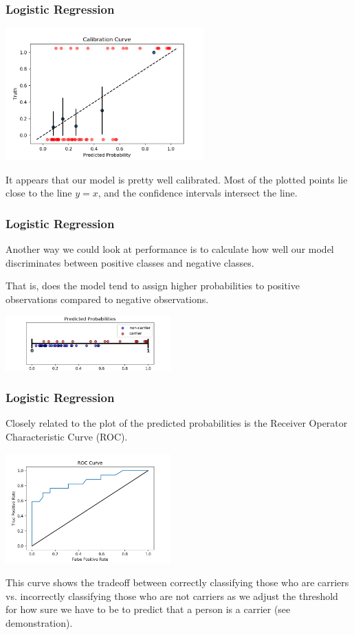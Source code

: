 \documentclass[11pt, table]{beamer}
\begin{document}
\begin{frame}
\frametitle{Logistic Regression}
\begin{center}
	\includegraphics[width=3in]{images/Dystrophy/calib_01.png}
\end{center}

It appears that our model is pretty well calibrated. Most of the plotted points lie close to the line $y = x$, and the confidence intervals intersect the line.
\end{frame}

\begin{frame}
\frametitle{Logistic Regression}
Another way we could look at performance is to calculate how well our model discriminates between positive classes and negative classes. 
\vspace{0.1in}

That is, does the model tend to assign higher probabilities to positive observations compared to negative observations. 
\vspace{0.1in}

\begin{center}
	\includegraphics[width = 2.5in]{images/Dystrophy/pred_proba_01.png}
\end{center}
\end{frame}

\begin{frame}
\frametitle{Logistic Regression}
Closely related to the plot of the predicted probabilities is the Receiver Operator Characteristic Curve (ROC).

\begin{center}
	\includegraphics[width = 2.5in]{images/Dystrophy/roc_01.png}
\end{center}

This curve shows the tradeoff between correctly classifying those who are carriers vs. incorrectly classifying those who are not carriers as we adjust the threshold for how sure we have to be to predict that a person is a carrier (see demonstration).
\end{frame}
\end{document}
